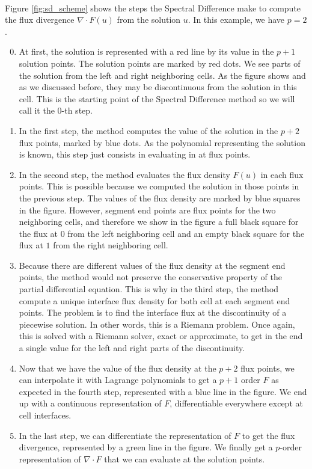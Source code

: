       \paragraph{}
      Figure \ref{fig:sd_scheme} shows the steps the Spectral Difference make to compute the flux divergence $\nabla \cdot F\left(u\right)$ from the solution $u$.
      In this example, we have $p = 2$.
      \begin{enumerate}
        \setcounter{enumi}{-1}
        \item At first, the solution is represented with a red line by its value in the $p + 1$ solution points.
        The solution points are marked by red dots.
        We see parts of the solution from the left and right neighboring cells.
        As the figure shows and as we discussed before, they may be discontinuous from the solution in this cell.
        This is the starting point of the Spectral Difference method so we will call it the 0-th step.
        \item In the first step, the method computes the value of the solution in the $p + 2$ flux points, marked by blue dots.
        As the polynomial representing the solution is known, this step just consists in evaluating in at flux points.
        \item In the second step, the method evaluates the flux density $F\left(u\right)$ in each flux points.
        This is possible because we computed the solution in those points in the previous step.
        The values of the flux density are marked by blue squares in the figure.
        However, segment end points are flux points for the two neighboring cells, and therefore we show in the figure a full black square for the flux at $0$ from the left neighboring cell and an empty black square for the flux at $1$ from the right neighboring cell.
        \item Because there are different values of the flux density at the segment end points, the method would not preserve the conservative property of the partial differential equation.
        This is why in the third step, the method compute a unique interface flux density for both cell at each segment end points.
        The problem is to find the interface flux at the discontinuity of a piecewise solution.
        In other words, this is a Riemann problem.
        Once again, this is solved with a Riemann solver, exact or approximate, to get in the end a single value for the left and right parts of the discontinuity.
        \item Now that we have the value of the flux density at the $p+2$ flux points, we can interpolate it with Lagrange polynomials to get a $p+1$ order $F$ as expected in the fourth step, represented with a blue line in the figure.
        We end up with a continuous representation of $F$, differentiable everywhere except at cell interfaces.
        \item In the last step, we can differentiate the representation of $F$ to get the flux divergence, represented by a green line in the figure.
        We finally get a $p$-order representation of $\nabla \cdot F$ that we can evaluate at the solution points.
      \end{enumerate}

